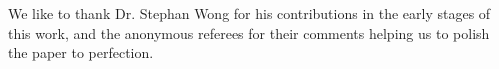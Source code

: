 We like to thank Dr. Stephan Wong for his contributions in the early stages of this
work, and the anonymous referees for their comments helping us to polish the
paper to perfection.
